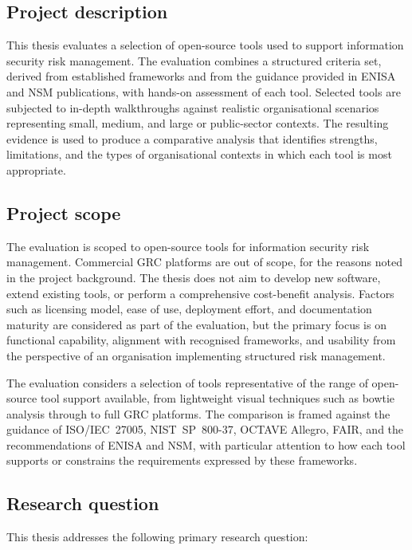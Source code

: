 \subsection{Project description}

This thesis evaluates a selection of open-source tools used to support
information security risk management. The evaluation combines a structured
criteria set, derived from established frameworks and from the guidance
provided in ENISA and NSM publications, with hands-on assessment of each
tool. Selected tools are subjected to in-depth walkthroughs against
realistic organisational scenarios representing small, medium, and large or
public-sector contexts. The resulting evidence is used to produce a
comparative analysis that identifies strengths, limitations, and the types
of organisational contexts in which each tool is most appropriate.

\subsection{Project scope}
\label{sec:project-scope}

The evaluation is scoped to open-source tools for information security risk
management. Commercial GRC platforms are out of scope, for the reasons
noted in the project background. The thesis does not aim to develop new
software, extend existing tools, or perform a comprehensive cost-benefit
analysis. Factors such as licensing model, ease of use, deployment effort,
and documentation maturity are considered as part of the evaluation, but
the primary focus is on functional capability, alignment with recognised
frameworks, and usability from the perspective of an organisation
implementing structured risk management.

The evaluation considers a selection of tools representative of the range
of open-source tool support available, from lightweight visual techniques
such as bowtie analysis through to full GRC platforms. The comparison is
framed against the guidance of ISO/IEC~27005, NIST~SP~800-37, OCTAVE
Allegro, FAIR, and the recommendations of ENISA and NSM, with particular
attention to how each tool supports or constrains the requirements
expressed by these frameworks.

\subsection{Research question}
\label{sec:research-question}

This thesis addresses the following primary research question:

